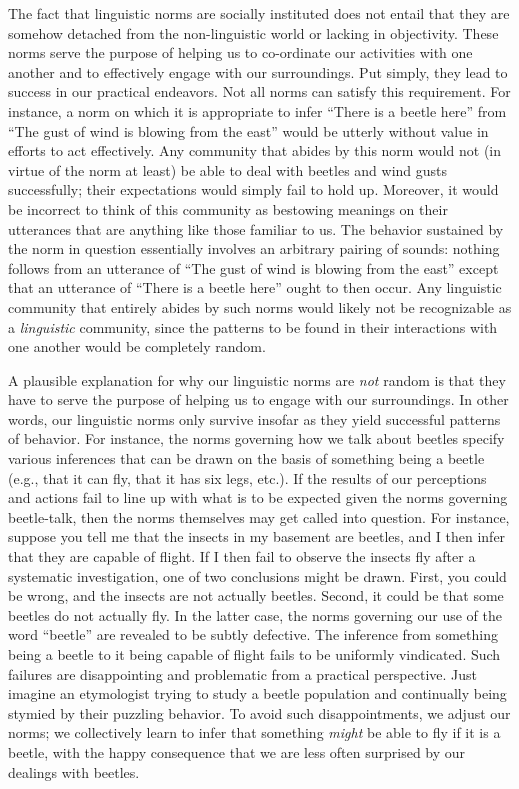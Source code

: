 The fact that linguistic norms are socially instituted does not entail that they are somehow detached from the non-linguistic world or lacking in objectivity. These norms serve the purpose of helping us to co-ordinate our activities with one another and to effectively engage with our surroundings. Put simply, they lead to success in our practical endeavors. Not all norms can satisfy this requirement. For instance, a norm on which it is appropriate to infer ``There is a beetle here'' from ``The gust of wind is blowing from the east'' would be utterly without value in efforts to act effectively. Any community that abides by this norm would not (in virtue of the norm at least) be able to deal with beetles and wind gusts successfully; their expectations would simply fail to hold up. Moreover, it would be incorrect to think of this community as bestowing meanings on their utterances that are anything like those familiar to us. The behavior sustained by the norm in question essentially involves an arbitrary pairing of sounds: nothing follows from an utterance of ``The gust of wind is blowing from the east'' except that an utterance of ``There is a beetle here'' ought to then occur. Any linguistic community that entirely abides by such norms would likely not be recognizable as a \textit{linguistic} community, since the patterns to be found in their interactions with one another would be completely random. 

A plausible explanation for why our linguistic norms are \textit{not} random is that they have to serve the purpose of helping us to engage with our surroundings. In other words, our linguistic norms only survive insofar as they yield successful patterns of behavior. For instance, the norms governing how we talk about beetles specify various inferences that can be drawn on the basis of something being a beetle (e.g., that it can fly, that it has six legs, etc.). If the results of our perceptions and actions fail to line up with what is to be expected given the norms governing beetle-talk, then the norms themselves may get called into question. For instance, suppose you tell me that the insects in my basement are beetles, and I then infer that they are capable of flight. If I then fail to observe the insects fly after a systematic investigation, one of two conclusions might be drawn. First, you could be wrong, and the insects are not actually beetles. Second, it could be that some beetles do not actually fly. In the latter case, the norms governing our use of the word ``beetle'' are revealed to be subtly defective. The inference from something being a beetle to it being capable of flight fails to be uniformly vindicated. Such failures are disappointing and problematic from a practical perspective. Just imagine an etymologist trying to study a beetle population and continually being stymied by their puzzling behavior. To avoid such disappointments, we adjust our norms; we collectively learn to infer that something \textit{might} be able to fly if it is a beetle, with the happy consequence that we are less often surprised by our dealings with beetles.

